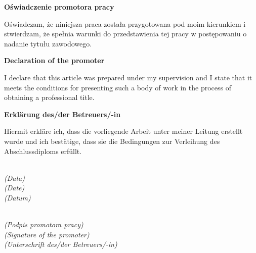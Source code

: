 \newpage


%
%
\begin{center}
    \textbf{Oświadczenie promotora pracy}
\end{center}
\noindent
Oświadczam, że niniejsza praca została przygotowana pod moim kierunkiem 
i stwierdzam, że spełnia warunki do przedstawienia tej pracy w postępowaniu 
o nadanie tytułu zawodowego.

\begin{center}
    \textbf{Declaration of the promoter}
\end{center}
\noindent
I declare that this article was prepared under my supervision and I state that it meets the conditions for presenting such a body of work in the process of obtaining a professional title.

\begin{center}
    \textbf{Erklärung des/der Betreuers/-in}
\end{center}
\noindent
Hiermit erkläre ich, dass die vorliegende Arbeit unter meiner Leitung erstellt wurde und ich bestätige, dass sie die Bedingungen zur Verleihung des Abschlussdiploms erfüllt.
\vspace{2cm}

\noindent
\begin{minipage}[t]{0.45\textwidth}
\dotfill\\
\textit{(Data)}\\
\textit{(Date)}\\
\textit{(Datum)}
\end{minipage}%
\hfill
\begin{minipage}[t]{0.45\textwidth}
\dotfill\\
\textit{(Podpis promotora pracy)}\\
\textit{(Signature of the promoter)}\\
\textit{(Unterschrift des/der Betreuers/-in)}
\end{minipage}
